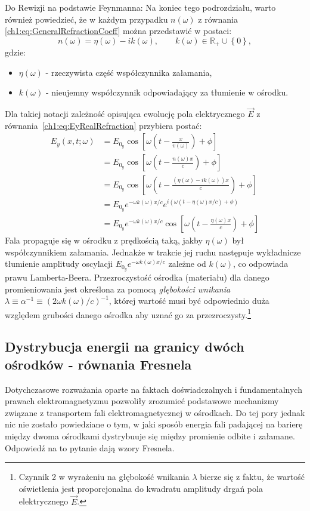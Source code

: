 {\color{red}Do Rewizji na podstawie Feynmanna:}
Na koniec tego podrozdziału, warto również powiedzieć, że w każdym przypadku $n(\omega)$ z równania \eqref{ch1:eq:GeneralRefractionCoeff} można przedstawić w postaci:
\begin{equation}
n(\omega) = \eta(\omega) - ik(\omega),\qquad k(\omega)\in\mathbb{R_+}\cup\left\lbrace 0 \right\rbrace,
\label{ch1:eq:SimplifiedRefractionCoeff}
\end{equation}
gdzie:
\begin{itemize}
\item[] $\eta(\omega)$ - rzeczywista część współczynnika załamania,
\item[] $k(\omega)$ - nieujemny współczynnik odpowiadający za tłumienie w ośrodku.
\end{itemize}
Dla takiej notacji zależność opisująca ewolucję pola elektrycznego $\vec{E}$ z równania~\eqref{ch1:eq:EyRealRefraction} przybiera postać:
\begin{align}
E_y(x,t; \omega) 	&= E_{0_y}\cos\left[\omega\left(t - \frac{x}{v(\omega)} \right) + \phi \right]\nonumber\\
					&= E_{0_y}\cos\left[\omega\left(t - \frac{n(\omega)x}{c} \right) + \phi \right]\nonumber\\
					&= E_{0_y}\cos\left[\omega\left(t - \frac{(\eta(\omega) - ik(\omega))x}{c} \right) + \phi \right]\nonumber\\
					&= E_{0_y}e^{-\omega k(\omega)x/c}e^{i\left(\omega\left(t - \eta(\omega)x/c \right) + \phi \right)}\nonumber\\
					&= E_{0_y}e^{-\omega k(\omega)x/c}\cos\left[\omega\left(t - \frac{\eta(\omega)x}{c} \right) + \phi \right]
\end{align}
Fala propaguje się w ośrodku z prędkością taką, jakby $\eta(\omega)$ był współczynnikiem załamania. Jednakże w trakcie jej ruchu następuje wykładnicze tłumienie amplitudy oscylacji $E_{0_y}e^{-\omega k(\omega)x/c}$ zależne od $k(\omega)$, co odpowiada prawu Lamberta-Beera. Przezroczystość ośrodka (materiału) dla danego promieniowania jest określona za pomocą \textit{głębokości wnikania} $\lambda\equiv\alpha^{-1}\equiv \left(2\omega k(\omega)/c\right)^{-1}$, której wartość musi być odpowiednio duża względem grubości danego ośrodka aby uznać go za przezroczysty.\footnote{Czynnik 2 w wyrażeniu na głębokość wnikania $\lambda$ bierze się z faktu, że wartość oświetlenia jest proporcjonalna do kwadratu amplitudy drgań pola elektrycznego $\vec{E}$.}

\subsection{Dystrybucja energii na granicy dwóch ośrodków - równania Fresnela}
Dotychczasowe rozważania oparte na faktach doświadczalnych i fundamentalnych prawach elektromagnetyzmu pozwoliły zrozumieć podstawowe mechanizmy związane z transportem fali elektromagnetycznej w ośrodkach. Do tej pory jednak nic nie zostało powiedziane o tym, w jaki sposób energia fali padającej na barierę między dwoma ośrodkami dystrybuuje się między promienie odbite i załamane. Odpowiedź na to pytanie dają wzory Fresnela.

